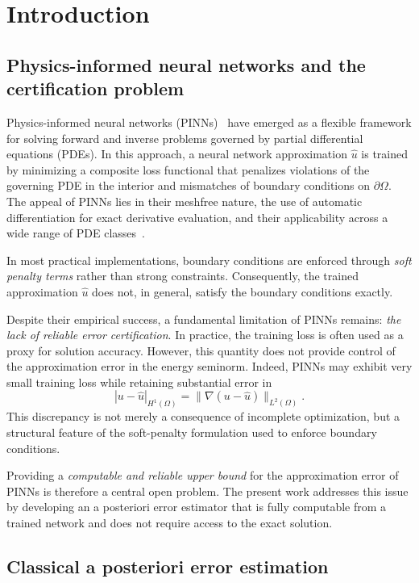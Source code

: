 \section{Introduction}\label{sec:introduction}

\subsection{Physics-informed neural networks and the certification problem}

Physics-informed neural networks (PINNs)~\cite{raissi2019physics} have
emerged as a flexible framework for solving forward and inverse problems
governed by partial differential equations (PDEs). In this approach, a neural
network approximation $\hat{u}$ is trained by minimizing a composite loss
functional that penalizes violations of the governing PDE in the interior
and mismatches of boundary conditions on $\partial\Omega$. The appeal of
PINNs lies in their meshfree nature, the use of automatic differentiation
for exact derivative evaluation, and their applicability across a wide range
of PDE classes~\cite{karniadakis2021physics}.

In most practical implementations, boundary conditions are enforced through
\emph{soft penalty terms} rather than strong constraints. Consequently, the
trained approximation $\hat{u}$ does not, in general, satisfy the boundary
conditions exactly.

Despite their empirical success, a fundamental limitation of PINNs remains:
\emph{the lack of reliable error certification}. In practice, the training
loss is often used as a proxy for solution accuracy. However, this quantity
does not provide control of the approximation error in the energy seminorm.
Indeed, PINNs may exhibit very small training loss while retaining
substantial error in
\[
|u - \hat{u}|_{H^1(\Omega)} = \|\nabla(u - \hat{u})\|_{L^2(\Omega)}.
\]
This discrepancy is not merely a consequence of incomplete optimization,
but a structural feature of the soft-penalty formulation used to enforce
boundary conditions.

Providing a \emph{computable and reliable upper bound} for the approximation
error of PINNs is therefore a central open problem. The present work addresses
this issue by developing an a posteriori error estimator that is fully
computable from a trained network and does not require access to the exact
solution.

\subsection{Classical a posteriori error estimation}


